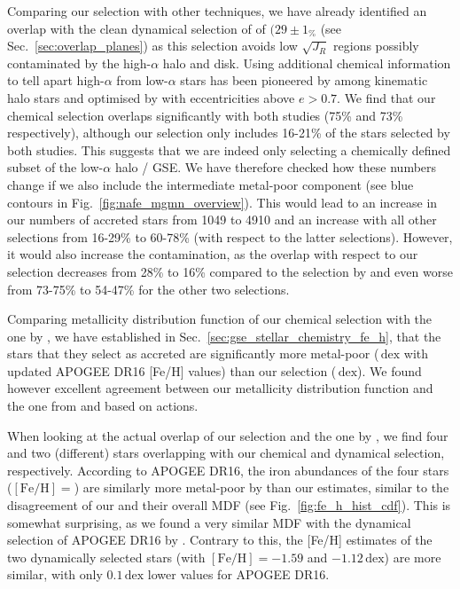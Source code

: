 \documentclass[fleqn,usenatbib]{mnras}
\newcommand{\dex}{\,\mathrm{dex}}	%
\begin{document}
Comparing our selection with other techniques, we have already identified an overlap with the clean dynamical selection of \citet{Feuillet2021} of $(29\pm1_\%$ (see Sec.~\ref{sec:overlap_planes}) as this selection avoids low $\sqrt{J_R}$ regions possibly contaminated by the high-$\alpha$ halo and disk. Using additional chemical information to tell apart high-$\alpha$ from low-$\alpha$ stars has been pioneered by \citet{Nissen2010} among kinematic halo stars and optimised by \citet{Naidu2020} with eccentricities above $e > 0.7$. We find that our chemical selection overlaps significantly with both studies (75\% and 73\% respectively), although our selection only includes 16-21\% of the stars selected by both studies. This suggests that we are indeed only selecting a chemically defined subset of the low-$\alpha$ halo / GSE. We have therefore checked how these numbers change if we also include the intermediate metal-poor component (see blue contours in Fig.~\ref{fig:nafe_mgmn_overview}). This would lead to an increase in our numbers of accreted stars from 1049 to 4910 and an increase with all other selections from 16-29\% to 60-78\% (with respect to the latter selections). However, it would also increase the contamination, as the overlap with respect to our selection decreases from 28\% to 16\% compared to the selection by \citet{Feuillet2021} and even worse from 73-75\% to 54-47\% for the other two selections.

Comparing metallicity distribution function of our chemical selection with the one by \citet{Das2020}, we have established in Sec.~\ref{sec:gse_stellar_chemistry_fe_h}, that the stars that they select as accreted are significantly more metal-poor ($\dex$ with updated APOGEE DR16 [Fe/H] values) than our selection ($\dex$). We found however excellent agreement between our metallicity distribution function and the one from \citet{Naidu2020} and \citet{Feuillet2020,Feuillet2021} based on actions.

When looking at the actual overlap of our selection and the one by \citet{Das2020}, we find four and two (different) stars overlapping with our chemical and dynamical selection, respectively. According to APOGEE DR16, the iron abundances of the four stars ($\mathrm{[Fe/H]} = $) are similarly more metal-poor by  than our estimates, similar to the disagreement of our and their overall MDF (see Fig.~\ref{fig:fe_h_hist_cdf}). This is somewhat surprising, as we found a very similar MDF with the dynamical selection of APOGEE DR16 by \citet{Feuillet2021}. Contrary to this, the [Fe/H] estimates of the two dynamically selected stars (with $\mathrm{[Fe/H]} = -1.59$ and $-1.12\dex$) are more similar, with only $0.1\dex$ lower values for APOGEE DR16.
\end{document}

